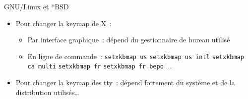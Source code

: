 \begin{frame}{GNU/Linux et *BSD}
    \begin{itemize}
        \item Pour changer la keymap de X~: \pause
            \begin{itemize}
                \item Par interface graphique~: dépend du gestionnaire de
                  bureau utilisé \pause

                \item En ligne de commande~:
                  \newline \texttt{setxkbmap us} \pause
                  \newline \texttt{setxkbmap us intl} \pause
                  \newline \texttt{setxkbmap ca multi} \pause
                  \newline \texttt{setxkbmap fr} \pause
                  \newline \texttt{setxkbmap fr bepo} \pause
                  ...
            \end{itemize}
            \pause

        \item Pour changer la keymap des tty~: dépend fortement du système et
          de la distribution utilisés…\pause
    \end{itemize}
\end{frame}
